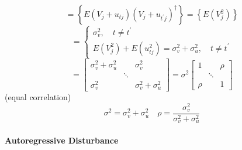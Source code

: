 \documentclass{article}
\begin{document}
\begin{equation*}
=\left\{ E\left( V_{j}+u_{tj}\right) \left( V_{j}+u_{t^{\prime }j}\right)
^{\dagger }\right\} =\left\{ E\left( V_{j}^{2}\right) \right\}
\end{equation*}%
\begin{equation*}
=\left\{ 
\begin{array}{c}
\sigma _{v}^{2},\quad t\neq t^{\prime } \\ 
E\left( V_{j}^{2}\right) +E\left( u_{tj}^{2}\right) =\sigma _{v}^{2}+\sigma
_{u}^{2},\quad t\neq t^{\prime }%
\end{array}%
\right.
\end{equation*}%
\begin{equation*}
=\left[ 
\begin{array}{ccc}
\sigma _{v}^{2}+\sigma _{u}^{2} &  & \sigma _{v}^{2} \\ 
& \ddots &  \\ 
\sigma _{v}^{2} &  & \sigma _{v}^{2}+\sigma _{u}^{2}%
\end{array}%
\right] =\sigma ^{2}\left[ 
\begin{array}{ccc}
1 &  & \rho \\ 
& \ddots &  \\ 
\rho &  & 1%
\end{array}%
\right]
\end{equation*}%
(equal correlation)%
\begin{equation*}
\sigma ^{2}=\sigma _{v}^{2}+\sigma _{u}^{2}\quad \rho =\frac{\sigma _{v}^{2}%
}{\sigma _{v}^{2}+\sigma _{u}^{2}}
\end{equation*}

\bigskip

\paragraph{Autoregressive Disturbance}

\quad

\bigskip
\end{document}
